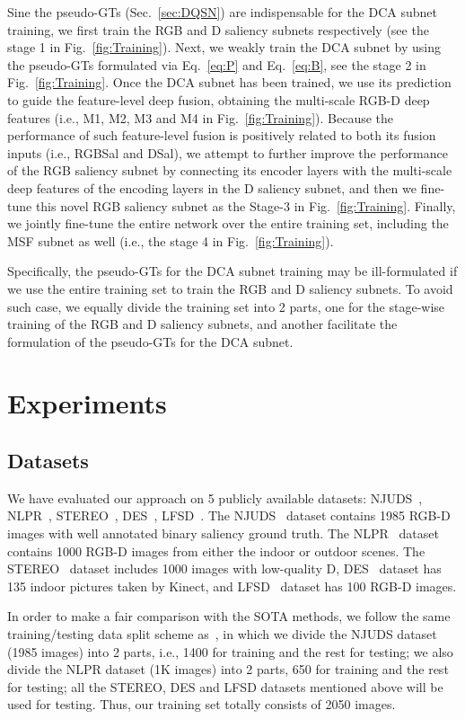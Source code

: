 \documentclass[journal]{IEEEtran}
\begin{document}
Sine the pseudo-GTs (Sec.~\ref{sec:DQSN}) are indispensable for the DCA subnet training, we first train the RGB and D
saliency subnets respectively (see the stage 1 in Fig.~\ref{fig:Training}).
Next, we weakly train the DCA subnet by using the pseudo-GTs formulated via Eq.~\ref{eq:P} and Eq.~\ref{eq:B}, see the stage 2 in Fig.~\ref{fig:Training}.
Once the DCA subnet has been trained, we use its prediction  to guide the feature-level deep fusion, obtaining the multi-scale RGB-D deep features (i.e., M1, M2, M3 and M4 in Fig.~\ref{fig:Training}).
Because the performance of such feature-level fusion is positively related to both its fusion inputs (i.e., RGBSal and DSal), we attempt to further improve the performance of the RGB saliency subnet by connecting its encoder layers with the multi-scale deep features of the encoding layers in the D saliency subnet, and then we fine-tune this novel RGB saliency subnet as the Stage-3 in Fig.~\ref{fig:Training}.
Finally, we jointly fine-tune the entire network over the entire training set, including the MSF subnet as well (i.e., the stage 4 in Fig.~\ref{fig:Training}).

Specifically, the pseudo-GTs for the DCA subnet training may be ill-formulated if we use the entire training set to train the RGB and D saliency subnets.
To avoid such case, we equally divide the training set into 2 parts, one for the stage-wise training of the RGB and D saliency subnets, and another facilitate the formulation of the pseudo-GTs for the DCA subnet.


\section{Experiments}
\subsection{Datasets}
We have evaluated our approach on 5 publicly available datasets: NJUDS~\cite{ICIP_J2014}, NLPR~\cite{ECCV_P2014}, STEREO~\cite{SSB}, DES~\cite{DES}, LFSD~\cite{LFSD}.
The NJUDS~\cite{ICIP_J2014} dataset contains 1985 RGB-D images with well annotated binary saliency ground truth.
The NLPR~\cite{ECCV_P2014} dataset contains 1000 RGB-D images from either the indoor or outdoor scenes.
The STEREO~\cite{SSB} dataset includes 1000 images with low-quality D, DES~\cite{DES} dataset has 135 indoor pictures taken by Kinect, and LFSD~\cite{LFSD} dataset has 100 RGB-D images.

In order to make a fair comparison with the SOTA methods, we follow the same training/testing data split scheme as~\cite{zhao2019contrast}, in which we divide the NJUDS dataset (1985 images) into 2 parts, i.e., 1400 for training and the rest for testing; we also divide the NLPR dataset (1K images) into 2 parts, 650 for training and the rest for testing; all the STEREO, DES and LFSD datasets mentioned above will be used for testing.
Thus, our training set totally consists of 2050 images.
\end{document}
